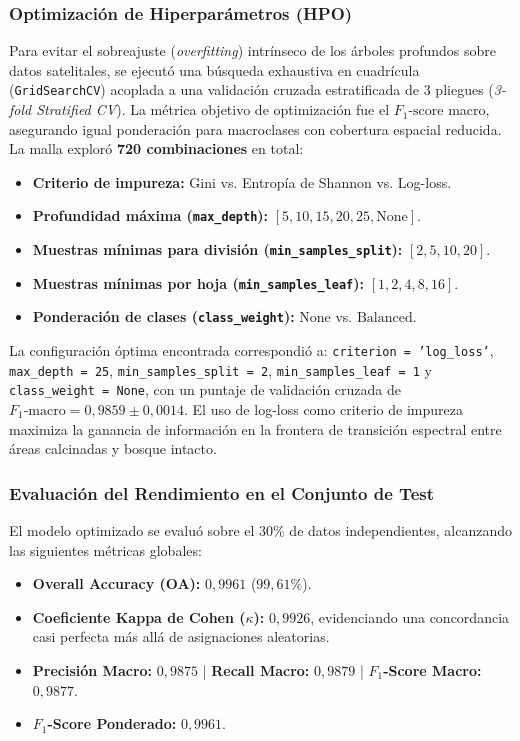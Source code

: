 \documentclass[12pt]{article}
\begin{document}
\subsubsection{Optimización de Hiperparámetros (HPO)}
Para evitar el sobreajuste (\textit{overfitting}) intrínseco de los árboles profundos sobre datos satelitales, se ejecutó una búsqueda exhaustiva en cuadrícula (\texttt{GridSearchCV}) acoplada a una validación cruzada estratificada de 3 pliegues (\textit{3-fold Stratified CV}). La métrica objetivo de optimización fue el $F_1\text{-score}$ macro, asegurando igual ponderación para macroclases con cobertura espacial reducida. La malla exploró \textbf{720 combinaciones} en total:

\begin{itemize}
    \item \textbf{Criterio de impureza:} Gini vs. Entropía de Shannon vs. Log-loss.
    \item \textbf{Profundidad máxima (\texttt{max\_depth}):} $[5, 10, 15, 20, 25, \text{None}]$.
    \item \textbf{Muestras mínimas para división (\texttt{min\_samples\_split}):} $[2, 5, 10, 20]$.
    \item \textbf{Muestras mínimas por hoja (\texttt{min\_samples\_leaf}):} $[1, 2, 4, 8, 16]$.
    \item \textbf{Ponderación de clases (\texttt{class\_weight}):} $\text{None}$ vs. $\text{Balanced}$.
\end{itemize}

La configuración óptima encontrada correspondió a: \texttt{criterion = 'log\_loss'}, \texttt{max\_depth = 25}, \texttt{min\_samples\_split = 2}, \texttt{min\_samples\_leaf = 1} y \texttt{class\_weight = None}, con un puntaje de validación cruzada de $F_1\text{-macro} = 0{,}9859 \pm 0{,}0014$. El uso de log-loss como criterio de impureza maximiza la ganancia de información en la frontera de transición espectral entre áreas calcinadas y bosque intacto.

\subsubsection{Evaluación del Rendimiento en el Conjunto de Test}
El modelo optimizado se evaluó sobre el 30\% de datos independientes, alcanzando las siguientes métricas globales:
\begin{itemize}
    \item \textbf{Overall Accuracy (OA):} $0{,}9961$ ($99{,}61\%$).
    \item \textbf{Coeficiente Kappa de Cohen ($\kappa$):} $0{,}9926$, evidenciando una concordancia casi perfecta más allá de asignaciones aleatorias.
    \item \textbf{Precisión Macro:} $0{,}9875$ | \textbf{Recall Macro:} $0{,}9879$ | \textbf{$F_1$-Score Macro:} $0{,}9877$.
    \item \textbf{$F_1$-Score Ponderado:} $0{,}9961$.
\end{itemize}
\end{document}
